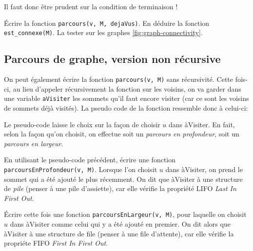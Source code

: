 Il faut donc être prudent sur la condition de terminaison !

\quessques Écrire la fonction \texttt{parcours(v, M, dejaVus)}.
\ssques En déduire la fonction \texttt{est_connexe(M)}.
\ssques La tester sur les graphes \autoref{fig:graph-connectivity}.

\subsection*{Parcours de graphe, version non récursive}

On peut également écrire la fonction \texttt{parcours(v, M)} sans récursivité. Cette fois-ci, au lieu d'appeler récursivement la fonction sur les voisins, on va garder dans une variable \texttt{aVisiter} les sommets qu'il faut encore visiter (car ce sont les voisins de sommets déjà visités). La pseudo code de la fonction ressemble donc à celui-ci:

\begin{algorithm}
    \DontPrintSemicolon
\end{algorithm}

Le pseudo-code laisse le choix sur la façon de choisir $ u $ dans àVisiter. En fait, selon la façon qu'on choisit, on effectue soit un \textit{parcours en profondeur}, soit un \textit{parcours en largeur}.

\ques En utilisant le pseudo-code précédent, écrire une fonction \texttt{parcoursEnProfondeur(v, M)}. Lorsque l'on choisit $ u $ dans àVisiter, on prend le sommet qui a été ajouté le plus récemment. On dit que àVisiter à une structure de \textit{pile} (penser à une pile d'assiette), car elle vérifie la propriété LIFO \textit{Last In First Out}.

\ques Écrire cette fois une fonction \texttt{parcoursEnLargeur(v, M)}, pour laquelle on choisit $ u $ dans àVisiter comme celui qui y a été ajouté en premier. On dit alors que àVisiter à une structure de file (penser à une file d'attente), car elle vérifie la propriéte FIFO \textit{First In First Out}. 


